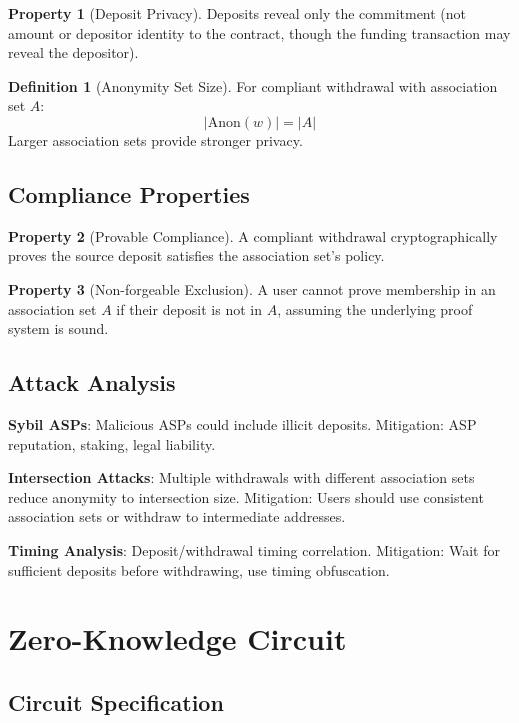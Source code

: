 \documentclass[11pt,a4paper]{article}
\theoremstyle{definition}
\newtheorem{definition}{Definition}
\newtheorem{property}{Property}
\begin{document}
\begin{property}[Deposit Privacy]
Deposits reveal only the commitment (not amount or depositor identity to the contract, though the funding transaction may reveal the depositor).
\end{property}

\begin{definition}[Anonymity Set Size]
For compliant withdrawal with association set $A$:
\[
|\text{Anon}(w)| = |A|
\]
Larger association sets provide stronger privacy.
\end{definition}

\subsection{Compliance Properties}

\begin{property}[Provable Compliance]
A compliant withdrawal cryptographically proves the source deposit satisfies the association set's policy.
\end{property}

\begin{property}[Non-forgeable Exclusion]
A user cannot prove membership in an association set $A$ if their deposit is not in $A$, assuming the underlying proof system is sound.
\end{property}

\subsection{Attack Analysis}

\textbf{Sybil ASPs}: Malicious ASPs could include illicit deposits. Mitigation: ASP reputation, staking, legal liability.

\textbf{Intersection Attacks}: Multiple withdrawals with different association sets reduce anonymity to intersection size. Mitigation: Users should use consistent association sets or withdraw to intermediate addresses.

\textbf{Timing Analysis}: Deposit/withdrawal timing correlation. Mitigation: Wait for sufficient deposits before withdrawing, use timing obfuscation.

\section{Zero-Knowledge Circuit}

\subsection{Circuit Specification}
\end{document}

